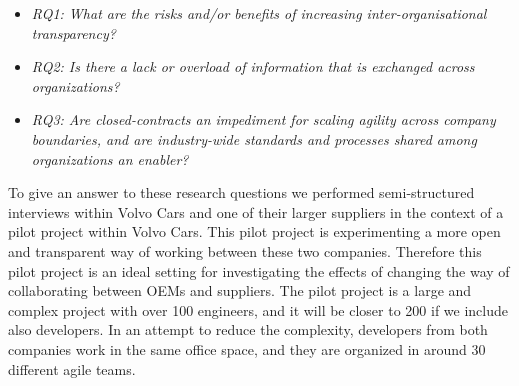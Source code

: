 \begin{itemize}
\item {\em RQ1: What are the risks and/or benefits of increasing inter-organisational transparency?}
\item {\em RQ2: Is there a lack or overload of information that is exchanged across organizations?} 
\item {\em RQ3: Are closed-contracts an impediment for scaling agility across company boundaries, and 
are industry-wide standards and processes shared among organizations an enabler?} 
\end{itemize}

To give an answer to these research questions we performed semi-structured interviews within Volvo Cars and 
one of their larger suppliers in the context of a pilot project within Volvo Cars. This pilot project is experimenting a more open and transparent way of working between these two companies. Therefore this pilot project is an ideal setting for investigating the effects of changing the way of collaborating between OEMs and suppliers.  
The pilot project is a large and complex project with over 100 engineers, and it will be closer to 200 if we include also developers. 
In an attempt to reduce the complexity, developers from both companies work in the same office space, and they are organized in around 30 different agile teams. %

